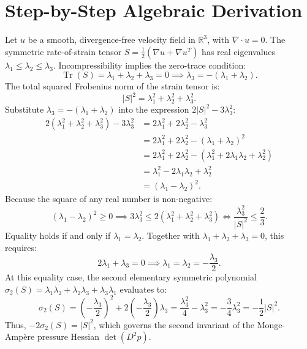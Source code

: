 \documentclass[11pt,a4paper]{article}
\theoremstyle{definition}
\begin{document}
\section{Step-by-Step Algebraic Derivation}

Let $u$ be a smooth, divergence-free velocity field in $\mathbb{R}^3$, with $\nabla \cdot u = 0$. The symmetric rate-of-strain tensor $S = \frac{1}{2}(\nabla u + \nabla u^T)$ has real eigenvalues $\lambda_1 \le \lambda_2 \le \lambda_3$. Incompressibility implies the zero-trace condition:
\begin{equation}
\operatorname{Tr}(S) = \lambda_1 + \lambda_2 + \lambda_3 = 0 \implies \lambda_3 = -(\lambda_1 + \lambda_2).
\end{equation}
The total squared Frobenius norm of the strain tensor is:
\begin{equation}
|S|^2 = \lambda_1^2 + \lambda_2^2 + \lambda_3^2.
\end{equation}
Substitute $\lambda_3 = -(\lambda_1 + \lambda_2)$ into the expression $2 |S|^2 - 3 \lambda_3^2$:
\begin{align}
2(\lambda_1^2 + \lambda_2^2 + \lambda_3^2) - 3\lambda_3^2 &= 2\lambda_1^2 + 2\lambda_2^2 - \lambda_3^2 \\
&= 2\lambda_1^2 + 2\lambda_2^2 - (\lambda_1 + \lambda_2)^2 \\
&= 2\lambda_1^2 + 2\lambda_2^2 - (\lambda_1^2 + 2\lambda_1\lambda_2 + \lambda_2^2) \\
&= \lambda_1^2 - 2\lambda_1\lambda_2 + \lambda_2^2 \\
&= (\lambda_1 - \lambda_2)^2.
\end{align}
Because the square of any real number is non-negative:
\begin{equation}
(\lambda_1 - \lambda_2)^2 \ge 0 \implies 3 \lambda_3^2 \le 2 (\lambda_1^2 + \lambda_2^2 + \lambda_3^2) \iff \frac{\lambda_3^2}{|S|^2} \le \frac{2}{3}.
\end{equation}
Equality holds if and only if $\lambda_1 = \lambda_2$. Together with $\lambda_1 + \lambda_2 + \lambda_3 = 0$, this requires:
\begin{equation}
2 \lambda_1 + \lambda_3 = 0 \implies \lambda_1 = \lambda_2 = -\frac{\lambda_3}{2}.
\end{equation}
At this equality case, the second elementary symmetric polynomial $\sigma_2(S) = \lambda_1 \lambda_2 + \lambda_2 \lambda_3 + \lambda_3 \lambda_1$ evaluates to:
\begin{equation}
\sigma_2(S) = \left(-\frac{\lambda_3}{2}\right)^2 + 2\left(-\frac{\lambda_3}{2}\right)\lambda_3 = \frac{\lambda_3^2}{4} - \lambda_3^2 = -\frac{3}{4}\lambda_3^2 = -\frac{1}{2}|S|^2.
\end{equation}
Thus, $-2 \sigma_2(S) = |S|^2$, which governs the second invariant of the Monge-Ampère pressure Hessian $\det(D^2 p)$.
\end{document}
